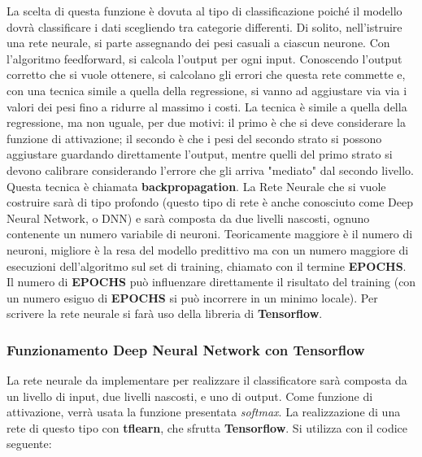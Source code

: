 \documentclass[10pt,a4paper]{report}
\begin{document}
La scelta di questa funzione è dovuta al tipo di classificazione poiché il modello dovrà classificare i dati scegliendo tra categorie differenti.
Di solito, nell'istruire una rete neurale, si parte assegnando dei pesi casuali a ciascun neurone. Con l'algoritmo feedforward, si calcola l'output per ogni input. Conoscendo l'output corretto che si vuole ottenere, si calcolano gli errori che questa rete commette e, con una tecnica simile a quella della regressione, si vanno ad aggiustare via via i valori dei pesi fino a ridurre al massimo i costi. La tecnica è simile a quella della regressione, ma non uguale, per due motivi: il primo è che si deve considerare la funzione di attivazione; il secondo è che i pesi del secondo strato si possono aggiustare guardando direttamente l'output, mentre quelli del primo strato si devono calibrare considerando l'errore che gli arriva "mediato" dal secondo livello. Questa tecnica è chiamata \textbf{backpropagation}.
La Rete Neurale che si vuole costruire sarà di tipo profondo (questo tipo di rete è anche conosciuto come Deep Neural Network, o DNN) e sarà composta da due livelli nascosti, ognuno contenente un numero variabile di neuroni. Teoricamente maggiore è il numero di neuroni, migliore è la resa del modello predittivo ma con un numero maggiore di esecuzioni dell'algoritmo sul set di training, chiamato con il termine \textbf{EPOCHS}. Il numero di \textbf{EPOCHS} può influenzare direttamente il risultato del training (con un numero esiguo di \textbf{EPOCHS} si può incorrere in un minimo locale). Per scrivere la rete neurale si farà uso della libreria di \textbf{Tensorflow}.

\subsubsection*{Funzionamento Deep Neural Network con Tensorflow}
La rete neurale da implementare per realizzare il classificatore sarà composta da un livello di input, due livelli nascosti, e uno di output. Come funzione di attivazione, verrà usata la funzione presentata \textit{softmax}. La realizzazione di una rete di questo tipo con \textbf{tflearn}, che sfrutta \textbf{Tensorflow}. Si utilizza con il codice seguente:
\end{document}
